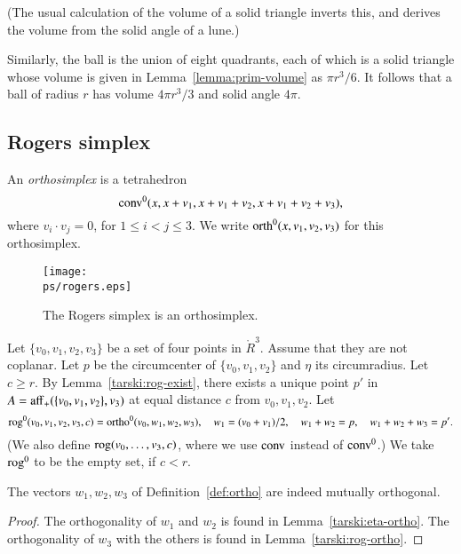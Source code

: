 (The usual calculation of the volume of a solid triangle
inverts this, and derives the volume from the solid angle of a lune.)

Similarly, the ball is the union of eight quadrants, each of
which is a solid triangle whose volume is given in
 Lemma~\ref{lemma:prim-volume} as $\pi r^3/6$. It follows that
a ball of radius $r$ has volume $4\pi r^3/3$ and solid angle
$4\pi$.



\subsection{Rogers simplex}

\begin{definition} \label{def:ortho}
An {\it orthosimplex} is a tetrahedron
    $${\operatorname{conv}}^0(x,x+v_1,x+v_1+v_2,x+v_1+v_2+v_3),$$
where $v_i\cdot v_j=0$, for $1\le i<j\le 3$.   We write
${\operatorname{orth}}^0(x,v_1,v_2,v_3)$ for this orthosimplex.
\end{definition}

\begin{figure}[htb]
  \centering
  \texttt{[image: \\ps/rogers.eps]}
  \caption{The Rogers simplex is an orthosimplex.}
  \label{fig:rogers}
\end{figure}


\begin{definition} \label{def:rog}
Let $\{v_0,v_1,v_2,v_3\}$ be a set of four points in $\ring{R}^3$.
Assume that they are not coplanar.  Let $p$ be the circumcenter
of $\{v_0,v_1,v_2\}$ and $\eta$ its circumradius.  Let $c\ge r$.
By Lemma~\ref{tarski:rog-exist}, there exists a unique
point $p'$ in $A={\operatorname{aff}}_+(\{v_0,v_1,v_2\},v_3)$ at equal distance $c$
from $v_0,v_1,v_2$.
Let $$
    {\operatorname{rog}}^0(v_0,v_1,v_2,v_3,c) = 
    {\operatorname{ortho}}^0(v_0,w_1,w_2,w_3),
    \quad w_1=(v_0+v_1)/2,\quad w_1+w_2=p,\quad w_1+w_2+w_3=p'.
    $$
(We also define ${\operatorname{rog}}(v_0,\ldots,v_3,c)$, where we use
${\operatorname{conv}}$ instead of ${\operatorname{conv}}^0$.)
We take ${\operatorname{rog}}^0$ to be the empty set, if $c< r$.
\end{definition}

\begin{lemma} The vectors $w_1,w_2,w_3$ of Definition~\ref{def:ortho}
are indeed mutually orthogonal.
\end{lemma}

\begin{proof} The orthogonality of $w_1$ and $w_2$ is found in
Lemma~\ref{tarski:eta-ortho}.  The orthogonality of $w_3$ with the
others is found in Lemma~\ref{tarski:rog-ortho}.
\end{proof}

